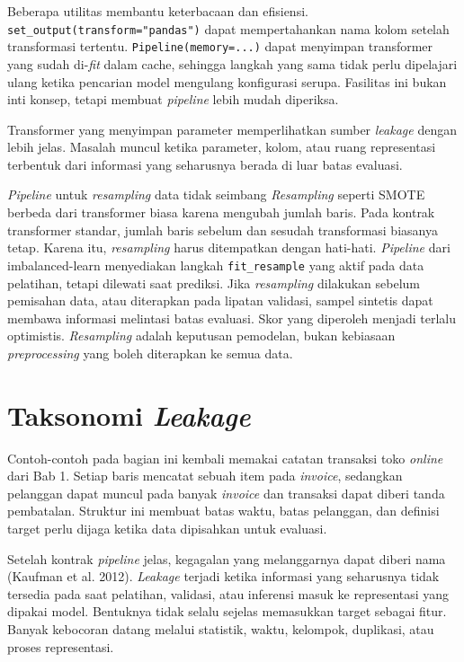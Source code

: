 Beberapa utilitas membantu keterbacaan dan efisiensi. \passthrough{\lstinline!set_output(transform="pandas")!} dapat mempertahankan nama kolom setelah transformasi tertentu. \passthrough{\lstinline!Pipeline(memory=...)!} dapat menyimpan transformer yang sudah di-\emph{fit} dalam cache, sehingga langkah yang sama tidak perlu dipelajari ulang ketika pencarian model mengulang konfigurasi serupa. Fasilitas ini bukan inti konsep, tetapi membuat \emph{pipeline} lebih mudah diperiksa.

Transformer yang menyimpan parameter memperlihatkan sumber \emph{leakage} dengan lebih jelas. Masalah muncul ketika parameter, kolom, atau ruang representasi terbentuk dari informasi yang seharusnya berada di luar batas evaluasi.

\begin{pendalaman}{\emph{Pipeline} untuk \emph{resampling} data tidak seimbang}
\emph{Resampling} seperti SMOTE berbeda dari transformer biasa karena mengubah jumlah baris. Pada kontrak transformer standar, jumlah baris sebelum dan sesudah transformasi biasanya tetap. Karena itu, \emph{resampling} harus ditempatkan dengan hati-hati. \emph{Pipeline} dari imbalanced-learn menyediakan langkah \passthrough{\lstinline!fit_resample!} yang aktif pada data pelatihan, tetapi dilewati saat prediksi. Jika \emph{resampling} dilakukan sebelum pemisahan data, atau diterapkan pada lipatan validasi, sampel sintetis dapat membawa informasi melintasi batas evaluasi. Skor yang diperoleh menjadi terlalu optimistis. \emph{Resampling} adalah keputusan pemodelan, bukan kebiasaan \emph{preprocessing} yang boleh diterapkan ke semua data.
\end{pendalaman}

\section{\texorpdfstring{Taksonomi \emph{Leakage}}{Taksonomi Leakage}}\label{taksonomi-leakage}

Contoh-contoh pada bagian ini kembali memakai catatan transaksi toko \emph{online} dari Bab 1. Setiap baris mencatat sebuah item pada \emph{invoice}, sedangkan pelanggan dapat muncul pada banyak \emph{invoice} dan transaksi dapat diberi tanda pembatalan. Struktur ini membuat batas waktu, batas pelanggan, dan definisi target perlu dijaga ketika data dipisahkan untuk evaluasi.

Setelah kontrak \emph{pipeline} jelas, kegagalan yang melanggarnya dapat diberi nama (Kaufman et al. 2012). \emph{Leakage} terjadi ketika informasi yang seharusnya tidak tersedia pada saat pelatihan, validasi, atau inferensi masuk ke representasi yang dipakai model. Bentuknya tidak selalu sejelas memasukkan target sebagai fitur. Banyak kebocoran datang melalui statistik, waktu, kelompok, duplikasi, atau proses representasi.

